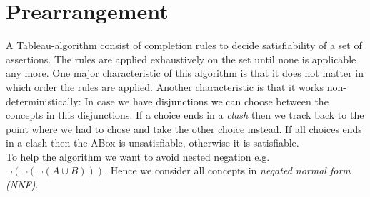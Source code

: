 \documentclass[a4paper,11pt]{scrartcl}
\theoremstyle{break}
\theoremstyle{definition}
\begin{document}
\section{Prearrangement}
A Tableau-algorithm consist of completion rules to decide satisfiability of a set of assertions. The rules are applied exhaustively on the set until none is applicable any more. One major characteristic of this algorithm is that it does not matter in which order the rules are applied. Another characteristic is that it works non-deterministically: In case we have disjunctions we can choose between the concepts in this disjunctions. If a choice ends in a \textit{clash} then we track back to the point where we had to chose and take the other choice instead. If all choices ends in a clash then the ABox is unsatisfiable, otherwise it is satisfiable.\\
To help the algorithm we want to avoid nested negation e.g. $\neg(\neg(\neg(A\cup B)))$. Hence we consider all concepts in \textit{negated normal form (NNF)}.
\end{document}
